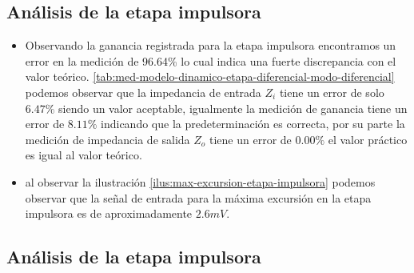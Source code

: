 \subsection{Análisis de la etapa impulsora}


\begin{itemize}
    \item Observando la ganancia registrada para la etapa impulsora encontramos un error en la medición de 96.64\% lo cual indica una fuerte discrepancia con el valor teórico. \ref{tab:med-modelo-dinamico-etapa-diferencial-modo-diferencial} podemos observar que la impedancia de entrada $Z_i$ tiene un error de solo $6.47\%$ siendo un valor aceptable, igualmente la medición de ganancia tiene un error de $8.11\%$ indicando que la predeterminación es correcta, por su parte la medición de impedancia de salida $Z_o$ tiene un error de $0.00\%$ el valor práctico es igual al valor teórico.
    \item al observar la ilustración \ref{ilus:max-excursion-etapa-impulsora} podemos observar que la señal de entrada para la máxima excursión en la etapa impulsora es de aproximadamente $2.6mV$.
\end{itemize}


\subsection{Análisis de la etapa impulsora}


